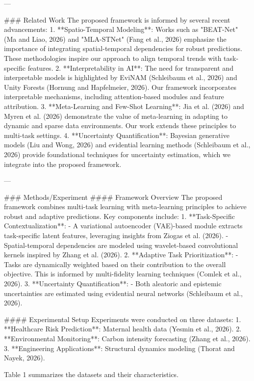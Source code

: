 ---

### Related Work
The proposed framework is informed by several recent advancements:
1. **Spatio-Temporal Modeling**: Works such as "BEAT-Net" (Ma and Liao, 2026) and "MLA-STNet" (Fang et al., 2026) emphasize the importance of integrating spatial-temporal dependencies for robust predictions. These methodologies inspire our approach to align temporal trends with task-specific features.
2. **Interpretability in AI**: The need for transparent and interpretable models is highlighted by EviNAM (Schleibaum et al., 2026) and Unity Forests (Hornung and Hapfelmeier, 2026). Our framework incorporates interpretable mechanisms, including attention-based modules and feature attribution.
3. **Meta-Learning and Few-Shot Learning**: Jia et al. (2026) and Myren et al. (2026) demonstrate the value of meta-learning in adapting to dynamic and sparse data environments. Our work extends these principles to multi-task settings.
4. **Uncertainty Quantification**: Bayesian generative models (Liu and Wong, 2026) and evidential learning methods (Schleibaum et al., 2026) provide foundational techniques for uncertainty estimation, which we integrate into the proposed framework.

---

### Methods/Experiment
#### Framework Overview
The proposed framework combines multi-task learning with meta-learning principles to achieve robust and adaptive predictions. Key components include:
1. **Task-Specific Contextualization**:
   - A variational autoencoder (VAE)-based module extracts task-specific latent features, leveraging insights from Ziogas et al. (2026).
   - Spatial-temporal dependencies are modeled using wavelet-based convolutional kernels inspired by Zhang et al. (2026).
2. **Adaptive Task Prioritization**:
   - Tasks are dynamically weighted based on their contribution to the overall objective. This is informed by multi-fidelity learning techniques (Comlek et al., 2026).
3. **Uncertainty Quantification**:
   - Both aleatoric and epistemic uncertainties are estimated using evidential neural networks (Schleibaum et al., 2026).

#### Experimental Setup
Experiments were conducted on three datasets:
1. **Healthcare Risk Prediction**: Maternal health data (Yesmin et al., 2026).
2. **Environmental Monitoring**: Carbon intensity forecasting (Zhang et al., 2026).
3. **Engineering Applications**: Structural dynamics modeling (Thorat and Nayek, 2026).

Table 1 summarizes the datasets and their characteristics.

